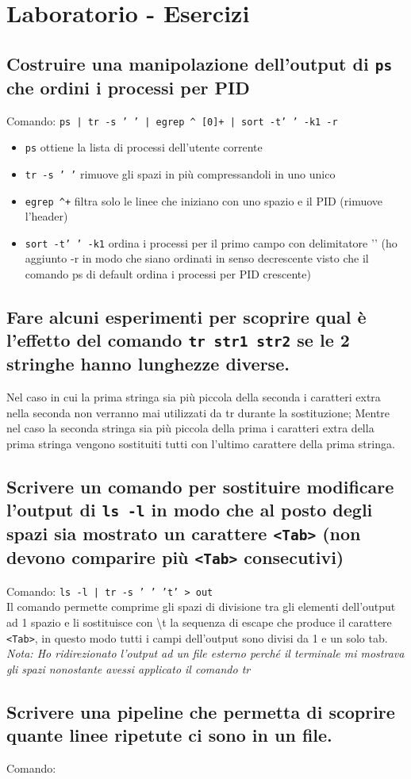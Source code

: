 \documentclass{article}
\begin{document}
\setcounter{section}{2} %
\section{Laboratorio - Esercizi}

\subsection{Costruire una manipolazione dell'output di \texttt{ps} che ordini i processi per PID}
Comando: \texttt{ps | tr -s ' ' | egrep \^{} [0]+ | sort -t' ' -k1 -r}
\begin{itemize}
    \item \texttt{ps} ottiene la lista di processi dell'utente corrente
    \item \texttt{tr -s ' '} rimuove gli spazi in più compressandoli in uno unico
    \item \texttt{egrep \^{}\space[0-9]+} filtra solo le linee che iniziano con uno spazio e il PID (rimuove l'header)
    \item \texttt{sort -t' ' -k1} ordina i processi per il primo campo con delimitatore '\space' 
    (ho aggiunto -r in modo che siano ordinati in senso decrescente visto che il comando ps di default ordina i processi per PID crescente)
\end{itemize}

\subsection{Fare alcuni esperimenti per scoprire qual è l'effetto del comando 
\texttt{tr str1 str2} se le 2 stringhe hanno lunghezze diverse.}
Nel caso in cui la prima stringa sia più piccola della seconda i caratteri extra nella seconda non verranno 
mai utilizzati da tr durante la sostituzione; Mentre nel caso la seconda stringa sia più piccola della prima i caratteri extra della prima 
stringa vengono sostituiti tutti con l'ultimo carattere della prima stringa.

\subsection{Scrivere un comando per sostituire modificare l'output di \texttt{ls -l} 
in modo che al posto degli spazi sia mostrato un carattere \texttt{<Tab>} 
(non devono comparire più \texttt{<Tab>} consecutivi)}
Comando: \texttt{ls -l | tr -s ' ' 't' > out}\\
Il comando permette comprime gli spazi di divisione tra gli elementi dell'output ad 1 spazio e li sostituisce con \textbackslash t 
la sequenza di escape che produce il carattere \texttt{<Tab>}, in questo modo tutti i campi dell'output sono divisi da 1 e un solo tab.
\textit{Nota: Ho ridirezionato l'output ad un file esterno perché il terminale mi mostrava gli spazi nonostante avessi applicato il comando tr}

\subsection{Scrivere una pipeline che permetta di scoprire quante linee ripetute ci sono in un file.}
Comando: 
\end{document}
